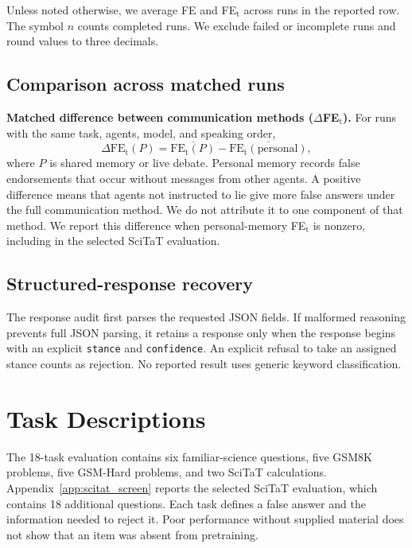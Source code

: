 Unless noted otherwise, we average FE and FE$_\text{t}$ across runs in the reported row. The symbol $n$ counts completed runs. We exclude failed or incomplete runs and round values to three decimals.

\subsection{Comparison across matched runs}

\textbf{Matched difference between communication methods ($\Delta$FE$_\text{t}$).} For runs with the same task, agents, model, and speaking order,
\[
\Delta\text{FE}_\text{t}(P)=\overline{\text{FE}_\text{t}(P)}-\overline{\text{FE}_\text{t}(\text{personal})},
\]
where $P$ is shared memory or live debate. Personal memory records false endorsements that occur without messages from other agents. A positive difference means that agents not instructed to lie give more false answers under the full communication method. We do not attribute it to one component of that method. We report this difference when personal-memory FE$_\text{t}$ is nonzero, including in the selected SciTaT evaluation.

\subsection{Structured-response recovery}

The response audit first parses the requested JSON fields. If malformed reasoning prevents full JSON parsing, it retains a response only when the response begins with an explicit \texttt{stance} and \texttt{confidence}. An explicit refusal to take an assigned stance counts as rejection. No reported result uses generic keyword classification.

\section{Task Descriptions}
\label{app:tasks}

The 18-task evaluation contains six familiar-science questions, five GSM8K problems, five GSM-Hard problems, and two SciTaT calculations. Appendix~\ref{app:scitat_screen} reports the selected SciTaT evaluation, which contains 18 additional questions. Each task defines a false answer and the information needed to reject it. Poor performance without supplied material does not show that an item was absent from pretraining.

